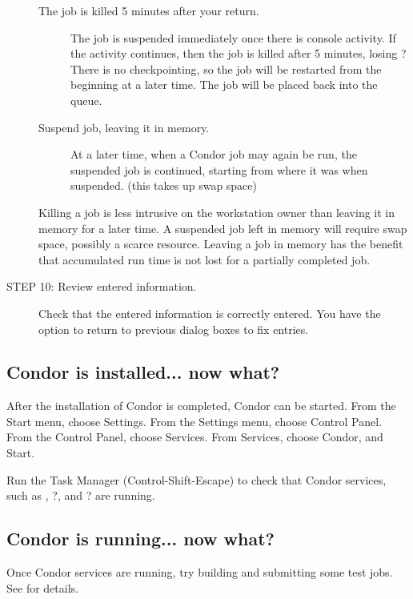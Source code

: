 \begin{description}
     \begin{description}
     \item[The job is killed 5 minutes after your return.]
     The job is suspended immediately once there is console activity.
     If the activity continues, then the job is
     killed after 5 minutes, losing ?
     There is no checkpointing, so the job will
     be restarted from the beginning at a later time.
     The job will be placed back into the queue.
     \item[ Suspend job, leaving it in memory.]
     At a later time, when a Condor job may again be run,
     the suspended job is continued, starting from where
     it was when suspended.
     (this takes up swap space)
     \end{description}

     Killing a job is less intrusive on the workstation owner
     than leaving it in memory for a later time.
     A suspended job left in memory will require swap space,
     possibly a scarce resource.
     Leaving a job in memory has the benefit that accumulated
     run time is not lost for a partially completed job.

\item[STEP 10: Review entered information.]
     Check that the entered information is correctly entered.
     You have the option to return to previous dialog boxes to fix entries.
\end{description}


\subsection{\label{nt-installed-now-what}
Condor is installed... now what?}

After the installation of Condor is completed, Condor can
be started.
From the Start menu, choose Settings.
From the Settings menu, choose Control Panel.
From the Control Panel, choose Services.
From Services, choose Condor, and Start.

Run the Task Manager (Control-Shift-Escape) to check that Condor
services, such as
, ?, and ? are running.

\subsection{\label{nt-running-now-what}
Condor is running... now what?}

Once Condor services are running, try building
and submitting some test jobs.  See 
for details.

